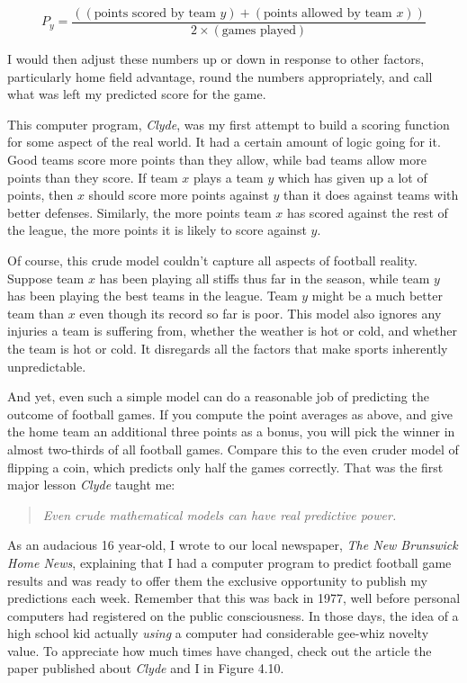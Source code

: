 \documentclass[10pt]{article}
\begin{document}
\[ P_y = \frac{((\text{points scored by team } y) + (\text{points allowed by team } x))}{2 \times (\text{games played})} \]

I would then adjust these numbers up or down in response to other factors, particularly home field advantage, round the numbers appropriately, and call what was left my predicted score for the game.

This computer program, \textit{Clyde}, was my first attempt to build a scoring function for some aspect of the real world. It had a certain amount of logic going for it. Good teams score more points than they allow, while bad teams allow more points than they score. If team \(x\) plays a team \(y\) which has given up a lot of points, then \(x\) should score more points against \(y\) than it does against teams with better defenses. Similarly, the more points team \(x\) has scored against the rest of the league, the more points it is likely to score against \(y\).

Of course, this crude model couldn’t capture all aspects of football reality. Suppose team \(x\) has been playing all stiffs thus far in the season, while team \(y\) has been playing the best teams in the league. Team \(y\) might be a much better team than \(x\) even though its record so far is poor. This model also ignores any injuries a team is suffering from, whether the weather is hot or cold, and whether the team is hot or cold. It disregards all the factors that make sports inherently unpredictable.

And yet, even such a simple model can do a reasonable job of predicting the outcome of football games. If you compute the point averages as above, and give the home team an additional three points as a bonus, you will pick the winner in almost two-thirds of all football games. Compare this to the even cruder model of flipping a coin, which predicts only half the games correctly. That was the first major lesson \textit{Clyde} taught me:

\begin{quote}
    \textit{Even crude mathematical models can have real predictive power.}
\end{quote}

As an audacious 16 year-old, I wrote to our local newspaper, \textit{The New Brunswick Home News}, explaining that I had a computer program to predict football game results and was ready to offer them the exclusive opportunity to publish my predictions each week. Remember that this was back in 1977, well before personal computers had registered on the public consciousness. In those days, the idea of a high school kid actually \textit{using} a computer had considerable gee-whiz novelty value. To appreciate how much times have changed, check out the article the paper published about \textit{Clyde} and I in Figure 4.10.
\end{document}
